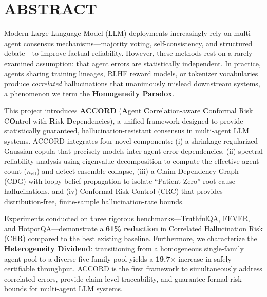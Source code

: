 \documentclass[12pt,a4paper]{report}
\begin{document}
\chapter*{ABSTRACT}

Modern Large Language Model (LLM) deployments increasingly rely on multi-agent consensus mechanisms---majority voting, self-consistency, and structured debate---to improve factual reliability. However, these methods rest on a rarely examined assumption: that agent errors are statistically independent. In practice, agents sharing training lineages, RLHF reward models, or tokenizer vocabularies produce \emph{correlated} hallucinations that unanimously mislead downstream systems, a phenomenon we term the \textbf{Homogeneity Paradox}.

This project introduces \textbf{ACCORD} (\textbf{A}gent \textbf{C}orrelation-aware \textbf{C}onformal Risk C\textbf{O}ntrol with \textbf{R}isk \textbf{D}ependencies), a unified framework designed to provide statistically guaranteed, hallucination-resistant consensus in multi-agent LLM systems. ACCORD integrates four novel components: (i) a shrinkage-regularized Gaussian copula that precisely models inter-agent error dependencies, (ii) spectral reliability analysis using eigenvalue decomposition to compute the effective agent count ($n_{\text{eff}}$) and detect ensemble collapse, (iii) a Claim Dependency Graph (CDG) with loopy belief propagation to isolate ``Patient Zero'' root-cause hallucinations, and (iv) Conformal Risk Control (CRC) that provides distribution-free, finite-sample hallucination-rate bounds.

Experiments conducted on three rigorous benchmarks---TruthfulQA, FEVER, and HotpotQA---demonstrate a \textbf{61\% reduction} in Correlated Hallucination Risk (CHR) compared to the best existing baseline. Furthermore, we characterize the \textbf{Heterogeneity Dividend}: transitioning from a homogeneous single-family agent pool to a diverse five-family pool yields a \textbf{19.7$\times$} increase in safely certifiable throughput. ACCORD is the first framework to simultaneously address correlated errors, provide claim-level traceability, and guarantee formal risk bounds for multi-agent LLM systems.

\tableofcontents
{}
\end{document}
